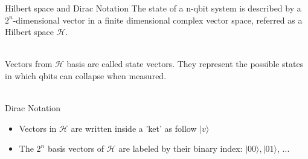 \documentclass[svgnames,smaller,aspectratio=169]{beamer}
\begin{document}
\begin{frame}[fragile]{Hilbert space and Dirac Notation}
  The state of a n-qbit system is described by a $2^n$-dimensional vector in a finite dimensional complex vector space,
  referred as a Hilbert space $\mathcal{H}$. \\~\

  Vectors from $\mathcal{H}$ basis are called state vectors. They represent the possible states in which qbits can
  collapse when measured. \\~\
  
  \begin{block}{Dirac Notation}
  \begin{itemize}
  \item Vectors in $\mathcal{H}$ are written inside a 'ket' as follow $|v\rangle$
  \item The $2^n$ basis vectors of $\mathcal{H}$ are labeled by their binary index: $ |00\rangle, |01\rangle$, ...
  \end{itemize}
  \end{block}

\end{frame}
\end{document}
